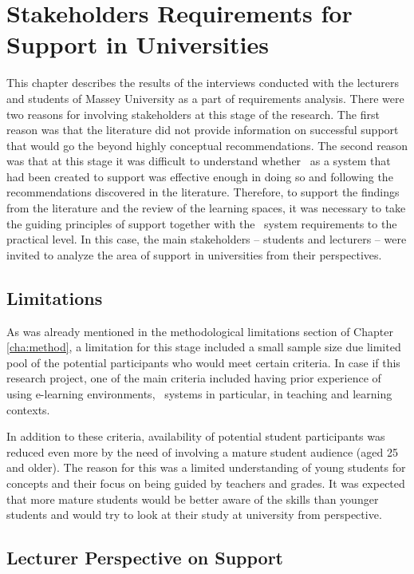 \chapter{Stakeholders Requirements for \LLLc Support in Universities
\label{cha:model}}
This chapter describes the results of the interviews conducted with the
lecturers and students of Massey University as a part of \LLLs requirements
analysis. There were two reasons for involving stakeholders at this stage of the
research. The first reason was that the literature did not provide information
on successful \LLLs support that would go the beyond highly conceptual
recommendations. The second reason was that at this stage it was difficult to
understand whether \ep~as a system that had been created to support \LLLs was
effective enough in doing so and following the recommendations discovered in the
literature. Therefore, to support the findings from the literature and the
review of the learning spaces, it was necessary to take the guiding principles
of \LLLs support together with the \ep~system requirements to the practical
level. In this case, the main stakeholders -- students and lecturers -- were
invited to analyze the area of \LLLs support in universities from their
perspectives.

\section{Limitations}

As was already mentioned in the methodological limitations section of Chapter
\ref{cha:method}, a limitation for this stage included a small sample size due
limited pool of the potential participants who would meet certain criteria. In
case if this research project, one of the main criteria included having prior
experience of using e-learning environments, \ep~systems in particular, in
teaching and learning contexts.

In addition to these criteria, availability of potential student participants
was reduced even more by the need of involving a mature student audience (aged
25 and older). The reason for this was a limited understanding of young students
for \LLLs concepts and their focus on being guided by teachers and grades. It
was expected that more mature students would be better aware of the \LLLs skills
than younger students and would try to look at their study at university from
\LLLs perspective.

\section{Lecturer Perspective on \LLLc Support}

